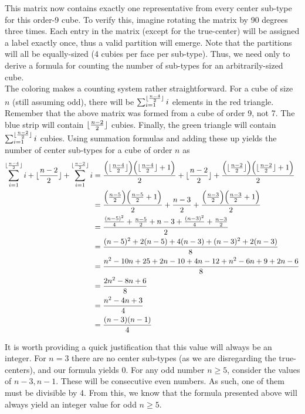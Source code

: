 \documentclass[10pt,letterpaper]{report}
\DeclarePairedDelimiter\floor{\lfloor}{\rfloor}
\begin{document}
This matrix now contains exactly one representative from every center sub-type for this order-9 cube.  To verify this, imagine rotating the matrix by 90 degrees three times.  Each entry in the matrix (except for the true-center) will be assigned a label exactly once, thus a valid partition will emerge.  Note that the partitions will all be equally-sized (4 cubies per face per sub-type).  Thus, we need only to derive a formula for counting the number of sub-types for an arbitrarily-sized cube. \\

The coloring makes a counting system rather straightforward.  For a cube of size $n$ (still assuming odd), there will be $\sum_{i=1}^{\floor{\frac{n-4}{2}}}i$ elements in the red triangle.  Remember that the above matrix was formed from a cube of order 9, not 7.  The blue strip will contain $\floor{\frac{n-2}{2}}$ cubies.  Finally, the green triangle will contain $\sum_{i=1}^{\floor{\frac{n-2}{2}}}i$ cubies.  Using summation formulas and adding these up yields the number of center sub-types for a cube of order $n$ as \begin{align*}
\sum_{i=1}^{\floor{\frac{n-4}{2}}}i + \floor{\frac{n-2}{2}} + \sum_{i=1}^{\floor{\frac{n-2}{2}}}i
&= \frac{\Big(\floor{\frac{n-4}{2}}\Big)\Big(\floor{\frac{n-4}{2}} + 1\Big)}{2} 
+ \floor{\frac{n-2}{2}} + 
\frac{\Big(\floor{\frac{n-2}{2}}\Big)\Big(\floor{\frac{n-2}{2}} + 1\Big)}{2} \\
&=\frac{\Big(\frac{n-5}{2}\Big)\Big(\frac{n-5}{2} + 1\Big)}{2} 
+ \frac{n-3}{2} + 
\frac{\Big(\frac{n-3}{2}\Big)\Big(\frac{n-3}{2} + 1\Big)}{2} \\
&= \frac{\frac{(n-5)^2}{4} + \frac{n-5}{2} + n - 3 + \frac{(n-3)^2}{4} + \frac{n-3}{2}}{2} \\
&= \frac{(n-5)^2 + 2(n-5) + 4(n-3) + (n-3)^2 + 2(n-3)}{8} \\
&= \frac{n^2 - 10n + 25 + 2n - 10 + 4n - 12 + n^2 - 6n + 9 + 2n - 6}{8} \\
&= \frac{2n^2 - 8n + 6}{8} \\
&= \frac{n^2 - 4n + 3}{4} \\
&= \frac{(n-3)(n-1)}{4}
\end{align*}

It is worth providing a quick justification that this value will always be an integer.  For $n=3$ there are no center sub-types (as we are disregarding the true-centers), and our formula yields 0.  For any odd number $n \geq 5$, consider the values of $n-3,n-1$.  These will be consecutive even numbers.  As such, one of them must be divisible by 4.  From this, we know that the formula presented above will always yield an integer value for odd $n \geq 5$. \\
\end{document}
